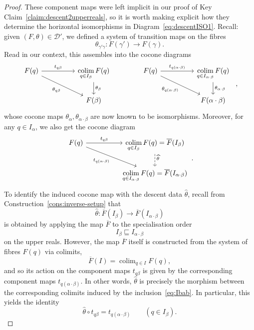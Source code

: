 \documentclass[a4paper, 11pt,reqno]{amsart}
\newcommand{\D}{\mathcal{D}}
\DeclareMathOperator*{\colim}{colim}
\begin{document}
\begin{proof}
These component maps were left implicit in our proof of Key Claim~\ref{claim:descent2upperreals}, so it is worth making explicit how they determine the horizontal isomorphisms in Diagram~\eqref{eq:descentISO1}. Recall: given $(F,\theta)\in\D'$, we defined a system of transition maps on the fibres 
$$\theta_{\gamma'\gamma}\colon F(\gamma')\to F(\gamma).$$
Read in our context, this assembles into the cocone diagrams
\begin{equation}\label{eq:descentISO2}
\begin{tikzcd}
F(q) \ar[rr,"t_{q\beta}"] \ar[drr,"\theta_{q\beta}",swap]&& \displaystyle\colim_{q\in I_{\beta}}F(q)\ar[d,"\theta_{\beta}"]\\
&& F(\beta)
\end{tikzcd}\qquad \qquad \begin{tikzcd}
F(q) \ar[rr,"t_{q(\alpha\cdot\beta)}"] \ar[drr,"\theta_{q(\alpha\cdot\beta)}",swap]&& \displaystyle\colim_{q\in I_{\alpha\cdot\beta }}F(q) \ar[d,"\theta_{\alpha\cdot\beta}"]\\
&& F(\alpha\cdot\beta)
\end{tikzcd}\,\,\,,
\end{equation}
whose cocone maps $\theta_{\alpha},\theta_{\alpha\cdot\beta}$ are now known to be isomorphisms. 
Moreover, for any $q\in I_{\alpha}$, we also get the cocone diagram
\begin{equation}\label{eq:descentISO3}
\begin{tikzcd}
F(q) \ar[rr,"t_{q\beta}"] \ar[drr,"t_{q(\alpha\cdot\beta)}",swap]&& \displaystyle\colim_{q\in I_{\beta}}F(q)\ar[d,dashed,"\widehat{\theta}" yshift=0.4em]  = \overline{F}(I_{\beta})\\
&& \displaystyle\colim_{q\in I_{\alpha\cdot\beta}}F(q) = \overline{F}(I_{\alpha\cdot\beta})
\end{tikzcd}\,.
\end{equation}
To identify the induced cocone map with the descent data $\widehat{\theta}$, recall from Construction~\ref{cons:inverse-setup} that
$$\widehat{\theta}\colon \overline{F}(I_{\beta})\to \overline{F}(I_{\alpha\cdot\beta})$$
is obtained by applying the map $\overline{F}$ to the specialisation order
\begin{equation}\label{eq:Ibab}
I_\beta\sqsubseteq I_{\alpha\cdot\beta}
\end{equation}
on the upper reals. However, the map $\overline{F}$ itself is
constructed from the system of fibres $F(q)$ via colimits,
\[
\overline F(I)=\colim_{q\in I}F(q),
\]
and so its action on the component maps $t_{q\beta}$ is given by the
corresponding component maps $t_{q(\alpha\cdot\beta)}$. In other words, 
$\widehat{\theta}$ is precisely the morphism between the corresponding
colimits induced by the inclusion~\eqref{eq:Ibab}. In particular, this yields the identity 
\begin{equation}\label{eq:descentISO4}
\widehat{\theta}\circ t_{q\beta}
=
t_{q(\alpha\cdot\beta)}
\qquad(q\in I_\beta).
\end{equation}
\smallskip


\end{proof}
\end{document}
